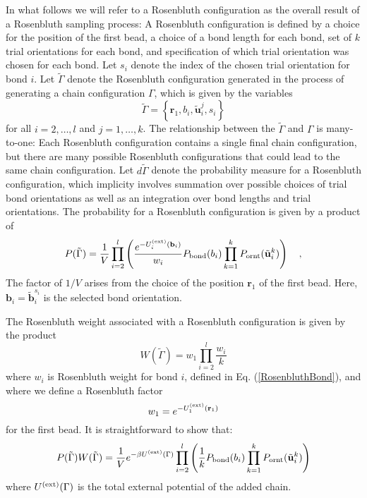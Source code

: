\documentclass[12pt]{article} %
\newcommand{\vv}[1]{\mathbf{#1}}
\newcommand\chain{\Gamma}
\newcommand\Uext{U^{({\rm ext})}}
\newcommand\vbead{\vv{r}}
\newcommand\nbead{l}
\newcommand\vbond{\vv{b}}
\newcommand\rbond{b}
\newcommand\ntrial{k}
\newcommand\vtrial{\tilde{\vv{b}}}
\newcommand\utrial{\tilde{\vv{u}}}
\newcommand\Pbond{P_{{\rm bond}}}
\newcommand\Pornt{P_{{\rm ornt}}}
\newcommand\rconfig{\tilde{\chain}}
\begin{document}
In what follows we will refer to a Rosenbluth configuration as the overall result of
a Rosenbluth sampling process: A Rosenbluth configuration is defined by a choice for
the position of the first bead, a choice of a bond length for each bond, set of 
$\ntrial$ trial orientations for each bond, and specification of which trial orientation 
was chosen for each bond. Let $s_{i}$ denote the index of the chosen trial orientation
for bond $i$.  Let $\rconfig$ denote the Rosenbluth configuration generated in the 
process of generating a chain configuration $\chain$, which is given by the variables
\begin{equation}
   \rconfig = \left \{ \vbead_{1},\rbond_{i},\utrial_{i}^{j},s_{i} \right \}
\end{equation}
for all $i=2,\ldots,\nbead$ and $j=1,\ldots,\ntrial$. The relationship between the 
$\rconfig$ and $\chain$ is many-to-one: Each Rosenbluth configuration contains a 
single final chain configuration, but there are many possible Rosenbluth configurations
that could lead to the same chain configuration. Let $d\rconfig$ denote the probability
measure for a Rosenbluth configuration, which implicity involves summation over possible choices of
trial bond orientations as well as an integration over bond lengths and trial
orientations. The probability for a Rosenbluth configuration is given by a product of
\begin{equation}
   P(\rconfig) = \frac{1}{V}
                 \prod_{i=2}^{\nbead} \left (
                 \frac{e^{-\Uext_{i}(\vbond_{i})}}{w_{i}}
                 \Pbond(\rbond_{i})
                 \prod_{k=1}^{\ntrial}
                 \Pornt(\utrial_{i}^{k}) \right )
   \quad,
\end{equation}
The factor of $1/V$ arises from the choice of the position $\vbead_{1}$ of the first
bead. Here, $\vbond_{i} = \vtrial_{i}^{s_{i}}$ is the selected bond orientation.

The Rosenbluth weight associated with a Rosenbluth configuration is given by the product
\begin{equation}
   W(\rconfig) = w_{1} \prod_{i=2}^{\nbead} \frac{w_{i}}{k}
\end{equation}
where $w_{i}$ is Rosenbluth weight for bond $i$, defined in Eq. (\ref{RosenbluthBond}),
and where we define a Rosenbluth factor
\begin{equation}
   w_{1} = e^{-\Uext_{1}(\vbead_{1})} 
\end{equation}
for the first bead. It is straightforward to show that: 
\begin{equation}
   P(\rconfig)W(\rconfig) 
   = \frac{1}{V} e^{-\beta\Uext(\chain)}
                 \prod_{i=2}^{\nbead} \left (
                 \frac{1}{k}
                 \Pbond(\rbond_{i})
                 \prod_{k=1}^{\ntrial}
                 \Pornt(\utrial_{i}^{k}) \right )
\end{equation}
where $\Uext(\chain)$ is the total external potential of the added chain.
\end{document}
